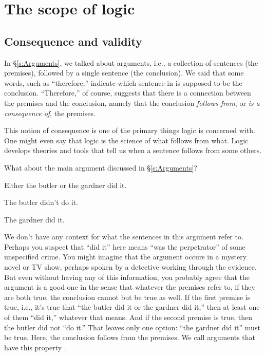 \chapter{The scope of logic}
\label{s:Valid}

\section{Consequence and validity}

In \S\ref{s:Arguments}, we talked about arguments, i.e., a collection of sentences (the premises), followed by a single sentence (the conclusion). We said that some words, such as ``therefore,'' indicate which sentence in is supposed to be the conclusion. ``Therefore,'' of course, suggests that there is a connection between the premises and the conclusion, namely that the conclusion \emph{follows from}, or \emph{is a consequence of}, the premises.

This notion of consequence is one of the primary things logic is concerned with. One might even say that logic is the science of what follows from what.  Logic develops theories and tools that tell us when a sentence follows from some others.

What about the main argument discussed in \S\ref{s:Arguments}? 
\begin{earg}
	\item[] Either the butler or the gardner did it.
	\item[] The butler didn't do it.
	\item[\therefore] The gardner did it.
\end{earg}
We don't have any context for what the sentences in this argument refer to. Perhaps you suspect that ``did it'' here means ``was the perpetrator'' of some unspecified crime. You might imagine that the argument occurs in a mystery novel or TV show, perhaps spoken by a detective working through the evidence. But even without having any of this information, you probably agree that the argument is a good one in the sense that whatever the premises refer to, if they are both true, the conclusion cannot but be true as well. If the first premise is true, i.e., it's true that ``the butler did it or the gardner did it,'' then at least one of them ``did it,'' whatever that means. And if the second premise is true, then the butler did not ``do it.'' That leaves only one option: ``the gardner did it'' must be true. Here, the conclusion follows from the premises. We call arguments that have this property .

